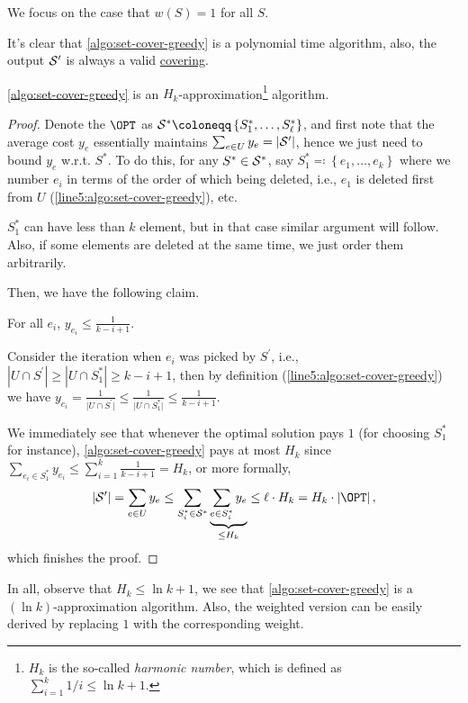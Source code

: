 We focus on the case that \(w(S) = 1\) for all \(S\).

\begin{remark}
	It's clear that \autoref{algo:set-cover-greedy} is a polynomial time algorithm, also, the output \(\mathcal{\MakeUppercase{S}} ^\prime \) is always a valid \hyperref[def:covering]{covering}.
\end{remark}

\begin{theorem}\label{thm:set-cover-k-approx}
	\autoref{algo:set-cover-greedy} is an \(H_k\)-approximation\footnote{\(H_k\) is the so-called \emph{harmonic number}, which is defined as \(\sum_{i=1}^{k} 1 / i \leq \ln k + 1\).} algorithm.
\end{theorem}
\begin{proof}
	Denote the \(\OPT\) as \(\mathcal{\MakeUppercase{S}} ^{\ast} \coloneqq \left\{ S_1^{\ast} , \ldots , S_{\ell}^{\ast} \right\}\), and first note that the average cost \(y_e\) essentially maintains \(\sum_{e\in U} y_e = \left\vert \mathcal{\MakeUppercase{S}} ^\prime  \right\vert\), hence we just need to bound \(y_e\) w.r.t. \(S^{\ast}\). To do this, for any \(S^{\ast} \in \mathcal{\MakeUppercase{S}} ^{\ast} \), say \(S_1^{\ast} \eqqcolon \left\{ e_1, \ldots , e_k  \right\} \) where we number \(e_i\) in terms of the order of which being deleted, i.e., \(e_1\) is deleted first from \(U\) (\autoref{line5:algo:set-cover-greedy}), etc.

	\begin{note}
		\(S_1^{\ast} \) can have less than \(k\) element, but in that case similar argument will follow. Also, if some elements are deleted at the same time, we just order them arbitrarily.
	\end{note}

	Then, we have the following claim.

	\begin{claim}\label{clm:set-cover-cost}
		For all \(e_i\), \(y_{e_i} \leq  \frac{1}{k - i + 1}\).
	\end{claim}
	\begin{explanation}
		Consider the iteration when \(e_i\) was picked by \(S^\prime\), i.e., \(\left\vert U \cap S^\prime  \right\vert \geq \left\vert U \cap S_1 ^{\ast} \right\vert \geq k - i + 1\), then by definition (\autoref{line5:algo:set-cover-greedy}) we have \(y_{e_i} = \frac{1}{\vert U \cap S^\prime  \vert } \leq \frac{1}{\vert U \cap  S_1 ^{\ast} \vert} \leq \frac{1}{k - i + 1}\).
	\end{explanation}

	We immediately see that whenever the optimal solution pays \(1\) (for choosing \(S_1^{\ast}\) for instance), \autoref{algo:set-cover-greedy} pays at most \(H_k\) since \(\sum_{e_i\in S_1^{\ast} }y_{e_i} \leq \sum_{i=1}^{k} \frac{1}{k-i+1} = H_k\), or more formally,
	\[
		\left\vert \mathcal{\MakeUppercase{S}} ^\prime  \right\vert = \sum_{e\in U}y_e \leq \sum_{S_i^{\ast} \in \mathcal{\MakeUppercase{S}} ^{\ast} }\underbrace{\sum_{e\in S_i^{\ast} }y_e}_{\leq H_k} \leq \ell \cdot H_k = H_k\cdot \left\vert \OPT \right\vert,
	\]
	which finishes the proof.
\end{proof}

In all, observe that \(H_k \leq \ln k + 1\), we see that \autoref{algo:set-cover-greedy} is a \((\ln k)\)-approximation algorithm. Also, the weighted version can be easily derived by replacing \(1\) with the corresponding weight.